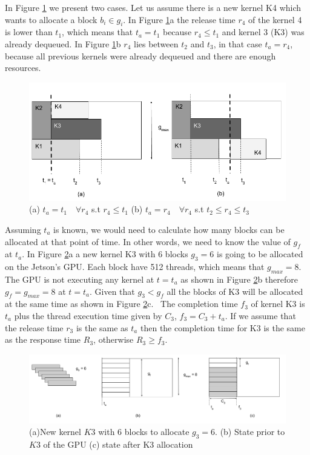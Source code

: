 \documentclass[
  12pt,
  a4paperpaper,
]{report}
\begin{document}
In Figure \ref{img:ta_example} we present two cases. Let us assume there
is a new kernel K4 which wants to allocate a block \(b_i \in g_i\). In
Figure \ref{img:ta_example}a the release time \(r_4\) of the kernel 4 is
lower than \(t_1\), which means that \(t_a = t_1\) because
\(r_4 \leq t_1\) and kernel 3 (K3) was already dequeued. In Figure
\ref{img:ta_example}b \(r_4\) lies between \(t_2\) and \(t_3\), in that
case \(t_a = r_4\), because all previous kernels were already dequeued
and there are enough resources.

\begin{figure}
\centering
\includegraphics{source/figures/ta_example.png}
\caption{(a) \(t_a=t_1 \quad \forall r_4\) s.t \(r_4 \leq t_1\) (b)
\(t_a=r_4 \quad \forall r_4\) s.t \(t_2 \leq r_4 \leq t_3\)
\label{img:ta_example}}
\end{figure}

Assuming \(t_a\) is known, we would need to calculate how many blocks
can be allocated at that point of time. In other words, we need to know
the value of \(g_f\) at \(t_a\). In Figure \ref{img:new_kernel_1}a a new
kernel K3 with 6 blocks \(g_3 = 6\) is going to be allocated on the
Jetson's GPU. Each block have 512 threads, which means that
\(g_{max} = 8\). The GPU is not executing any kernel at \(t=t_a\) as
shown in Figure \ref{img:new_kernel_1}b therefore \(g_f = g_{max} = 8\)
at \(t=t_a\). Given that \(g_3 < g_f\) all the blocks of K3 will be
allocated at the same time as shown in Figure \ref{img:new_kernel_1}c.~
The completion time \(f_3\) of kernel K3 is \(t_a\) plus the thread
execution time given by \(C_3\), \(f_3 = C_3 + t_a\). If we assume that
the release time \(r_3\) is the same as \(t_a\) then the completion time
for K3 is the same as the response time \(R_3\), otherwise
\(R_3 \geq f_3\).

\begin{figure}
\centering
\includegraphics{source/figures/new_kernel_1.png}
\caption{(a)New kernel \(K3\) with 6 blocks to allocate \(g_3 = 6\). (b)
State prior to \(K3\) of the GPU (c) state after K3 allocation
\label{img:new_kernel_1}}
\end{figure}
\end{document}
